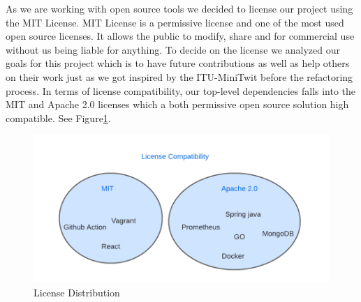 
As we are working with open source tools we decided to license our project using the MIT License. MIT License is a permissive license and one of the most used open source licenses. It allows the public to modify, share and for commercial use without us being liable for anything. To decide on the license we analyzed our goals for this project which is to have future contributions as well as help others on their work just as we got inspired by the ITU-MiniTwit before the refactoring process. In terms of license compatibility, our top-level dependencies falls into the MIT and Apache 2.0 licenses which a both permissive open source solution high compatible. See Figure\ref{fig:license}.
\begin{figure}[h]
    \centering
    \includegraphics[width = .7\textwidth]{images/License.png}
    \caption{License Distribution}
    \label{fig:license}
\end{figure}